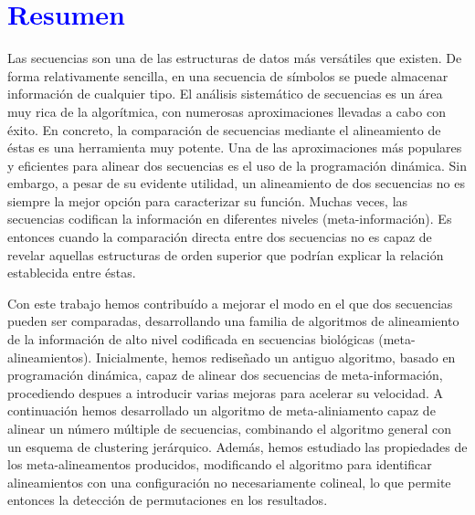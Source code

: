 \clearemptydoublepage

\chapter*{\textcolor{blue}{\textbf{R}esumen}}
\begin{small}
Las secuencias son una de las estructuras de datos más versátiles que
existen. De forma relativamente sencilla, en una secuencia de símbolos
se puede almacenar información de cualquier tipo. El análisis sistemático
de secuencias es un área muy rica de la algorítmica, con numerosas aproximaciones
llevadas a cabo con éxito. En concreto, la comparación de secuencias mediante
el alineamiento de éstas es una herramienta muy potente. Una de las aproximaciones
más populares y eficientes para alinear dos secuencias es el uso de la programación
dinámica. Sin embargo, a pesar de su evidente utilidad, un alineamiento de dos 
secuencias no es siempre la mejor opción para caracterizar su función. Muchas veces,
las secuencias codifican la información en diferentes niveles (meta-información).
Es entonces cuando la comparación directa entre dos secuencias no es capaz de
revelar aquellas estructuras de orden superior que podrían explicar la relación
establecida entre éstas.

Con este trabajo hemos contribuído a mejorar el modo en el que dos secuencias
pueden ser comparadas, desarrollando una familia de algoritmos de alineamiento
de la información de alto nivel codificada en secuencias biológicas
(meta-alineamientos).  Inicialmente, hemos rediseñado un antiguo algoritmo, basado en 
programación dinámica, capaz de alinear dos secuencias de meta-información, 
procediendo despues a introducir varias mejoras para acelerar su velocidad.
A continuación hemos desarrollado un algoritmo de meta-aliniamento capaz de alinear 
un número múltiple de secuencias, combinando el algoritmo general con un esquema de 
clustering jerárquico. Además, hemos estudiado las propiedades de los meta-alineamentos 
producidos, modificando el algoritmo para identificar alineamientos con una 
configuración no necesariamente colineal, lo que permite entonces la detección
de permutaciones en los resultados.


\end{small}
